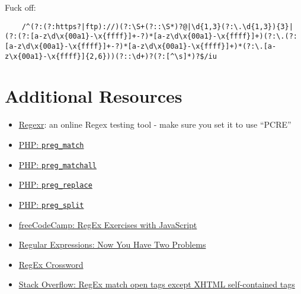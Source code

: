 Fuck off:

\begin{verbatim}
    /^(?:(?:https?|ftp)://)(?:\S+(?::\S*)?@|\d{1,3}(?:\.\d{1,3}){3}|(?:(?:[a-z\d\x{00a1}-\x{ffff}]+-?)*[a-z\d\x{00a1}-\x{ffff}]+)(?:\.(?:[a-z\d\x{00a1}-\x{ffff}]+-?)*[a-z\d\x{00a1}-\x{ffff}]+)*(?:\.[a-z\x{00a1}-\x{ffff}]{2,6}))(?::\d+)?(?:[^\s]*)?$/iu
\end{verbatim}



\section{Additional Resources}

\begin{itemize}[leftmargin=*]
    \item \href{https://regexr.com}{Regexr}: an online Regex testing tool - make sure you set it to use ``PCRE''
    \item \href{http://www.php.net/manual/en/function.preg-match.php}{PHP: \texttt{preg\_match}}
    \item \href{http://www.php.net/manual/en/function.preg-match-all.php}{PHP: \texttt{preg\_matchall}}
    \item \href{http://www.php.net/manual/en/function.preg-replace.php}{PHP: \texttt{preg\_replace}}
    \item \href{http://www.php.net/manual/en/function.preg-split.php}{PHP: \texttt{preg\_split}}
    \item \href{https://www.freecodecamp.org/learn/javascript-algorithms-and-data-structures/regular-expressions/using-the-test-method}{freeCodeCamp: RegEx Exercises with JavaScript}
    \item \href{https://blog.codinghorror.com/regular-expressions-now-you-have-two-problems/}{Regular Expressions: Now You Have Two Problems}
    \item \href{http://www.regexcrossword.com/}{RegEx Crossword}
    \item \href{https://stackoverflow.com/a/1732454}{Stack Overflow: RegEx match open tags except XHTML self-contained tags}
\end{itemize}

